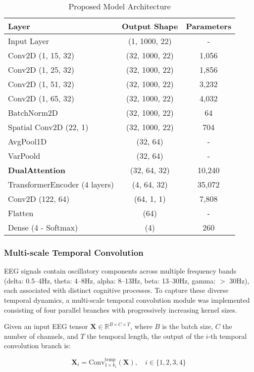 \documentclass[pdflatex,sn-mathphys-num]{sn-jnl}%
\theoremstyle{thmstyleone}%
\theoremstyle{thmstyletwo}%
\theoremstyle{thmstylethree}%
\begin{document}
\begin{table}[!ht]
\centering
\caption{Proposed Model Architecture}
\label{tab:architecture}
\begin{tabular}{|l|c|c|}
\hline
\textbf{Layer} & \textbf{Output Shape} & \textbf{Parameters} \\
\hline
Input Layer & (1, 1000, 22) & - \\
\hline
Conv2D (1, 15, 32) & (32, 1000, 22) & 1,056 \\
\hline
Conv2D (1, 25, 32) & (32, 1000, 22) & 1,856 \\
\hline
Conv2D (1, 51, 32) & (32, 1000, 22) & 3,232 \\
\hline
Conv2D (1, 65, 32) & (32, 1000, 22) & 4,032 \\
\hline
BatchNorm2D & (32, 1000, 22) & 64 \\
\hline
Spatial Conv2D (22, 1) & (32, 1000, 22) & 704 \\
\hline
AvgPool1D & (32, 64) & - \\
\hline
VarPoold & (32, 64) & - \\
\hline
\textbf{DualAttention} & (32, 64, 32) & 10,240 \\
\hline
TransformerEncoder (4 layers) & (4, 64, 32) & 35,072 \\
\hline
Conv2D (122, 64) & (64, 1, 1) & 7,808 \\
\hline
Flatten & (64) & - \\
\hline
Dense (4 - Softmax) & (4) & 260 \\
\hline
\end{tabular}
\end{table}


\subsubsection{Multi-scale Temporal Convolution}
EEG signals contain oscillatory components across multiple frequency bands (delta: 0.5--4Hz, theta: 4--8Hz, alpha: 8--13Hz, beta: 13--30Hz, gamma: $>$ 30Hz), each associated with distinct cognitive processes. To capture these diverse temporal dynamics, a multi-scale temporal convolution module was implemented  consisting of four parallel branches with progressively increasing kernel sizes. 

Given an input EEG tensor $\mathbf{X} \in \mathbb{R}^{B \times C \times T}$, where $B$ is the batch size, $C$ the number of channels, and $T$ the temporal length, the output of the $i$-th temporal convolution branch is:

\begin{equation}
\mathbf{X}_i = \text{Conv}^{\text{temp}}_{1 \times k_i}(\mathbf{X}), \quad i \in \{1,2,3,4\}
\end{equation}
\end{document}
